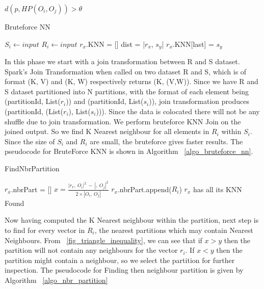 \medskip

\begin{center}

$d(p, HP(O_i, O_j)) > \theta $

\end{center}


\begin{algorithm}
  \caption{Bruteforce NN}
  \label{algo_bruteforce_nn}
  \begin{algorithmic}[1]
    \STATE $S_i \leftarrow input$
    \STATE $R_i \leftarrow input$
    \STATE $r_x$.KNN = []
    \STATE dist = |$r_x$, $s_y$|
    \STATE $r_x$.KNN[last] = $s_y$
    \ENDIF
    \ENDFOR
    \ENDFOR
  \end{algorithmic}
\end{algorithm}


In this phase we start with a join transformation between R
and S dataset. Spark's Join Transformation when called on two dataset R and S,
which is of format (K, V) and (K, W) respectively returns (K,
(V,W)). Since we have R and S dataset partitioned into N partitions,
with the format of each element being (partitionId, List($r_i$)) and
(partitionId, List($s_i$)), join transformation produces (partitionId,
(List($r_i$), List($s_i$))). Since the data is colocated there will not
be any shuffle due to join transformation. We perform bruteforce KNN
Join on the joined output. So we find K Nearest neighbour for all
elements in $R_i$ within $S_i$. Since the size of $S_i$ and $R_i$ are
small, the bruteforce gives faster results. The pseudocode for
BruteForce KNN is shown in Algorithm ~\ref{algo_bruteforce_nn}.

\begin{algorithm}
  \caption{FindNbrPartition}
  \label{algo_nbr_partition}
  \begin{algorithmic}[1]
    \STATE $r_x$.nbrPart = []
    \STATE $x = \frac{|r_x,\ O_i|^2\ -\ |,\ O_j|^2}{2 \times |O_i,\
      O_j|}$
    \STATE $r_x$.nbrPart.append($R_i$)
    \ELSE
    \STATE $r_x$ has all its KNN Found
    \ENDIF
    \ENDFOR
    \ENDFOR
    \ENDFOR
  \end{algorithmic}
\end{algorithm}



Now having computed the K Nearest neighbour within the partition, next
step is to find for every vector in $R_i$, the nearest
partitions which may contain Nearest Neighbours. From ~\ref{fig_triangle_inequality}, we can see that if $x > y
$ then the partition will not contain any neighbours for the vector
$r_i$. If $x < y$ then the partition might contain a neighbour, so we
select the partition for further inspection. The pseudocode for
Finding then neighbour partition is given by Algorithm ~\ref{algo_nbr_partition}

